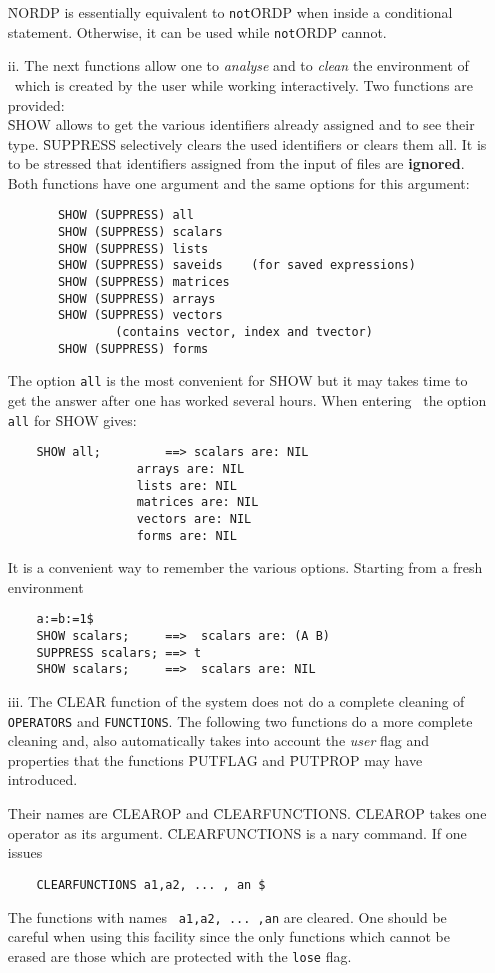 \begin{itemize}
\f{NORDP} is essentially equivalent to \verb+not+\f{ORDP}
when inside a conditional statement. Otherwise, it can be used
while \verb+not+\f{ORDP} cannot.
\item[ii.]
The next functions allow one to {\em analyse} and to {\em clean} the
environment of \REDUCE\  which is created by the user while
working interactively.  Two functions are provided:\\
\f{SHOW} allows to get the various identifiers already
assigned and to see their type.  \f{SUPPRESS}
selectively clears the used identifiers or clears them all.  It is to
be stressed that identifiers assigned from the input of files are {\bf
ignored}.  Both functions have one argument and the same options for
this argument:
\begin{verbatim}
       SHOW (SUPPRESS) all
       SHOW (SUPPRESS) scalars
       SHOW (SUPPRESS) lists
       SHOW (SUPPRESS) saveids    (for saved expressions)
       SHOW (SUPPRESS) matrices
       SHOW (SUPPRESS) arrays
       SHOW (SUPPRESS) vectors
		       (contains vector, index and tvector)
       SHOW (SUPPRESS) forms
\end{verbatim}
The option \verb+all+ is the most convenient for \f{SHOW} but it may
takes time to get the answer after one has worked several hours.
When entering \REDUCE\ the option \verb+all+ for \f{SHOW} gives:
\begin{verbatim}
	SHOW all;         ==> scalars are: NIL
			      arrays are: NIL
			      lists are: NIL
			      matrices are: NIL
			      vectors are: NIL
			      forms are: NIL
\end{verbatim}
It is a convenient way to remember the various options.
Starting from a fresh environment
\begin{verbatim}
	a:=b:=1$
	SHOW scalars;     ==>  scalars are: (A B)
	SUPPRESS scalars; ==> t
	SHOW scalars;     ==>  scalars are: NIL
\end{verbatim}
\item[iii.]
The \f{CLEAR} function of the system does not do a
complete cleaning of \verb+OPERATORS+ and \verb+FUNCTIONS+.  The
following two functions do a more complete cleaning and, also
automatically takes into account the {\em user} flag and properties that the
functions \f{PUTFLAG} and \f{PUTPROP} may have introduced.

Their names are \f{CLEAROP} and
\f{CLEARFUNCTIONS}.
\f{CLEAROP} takes one operator as its argument.  \f{CLEARFUNCTIONS} is
a nary command. If one issues
\begin{verbatim}
	CLEARFUNCTIONS a1,a2, ... , an $
\end{verbatim}
The functions with names \verb+ a1,a2, ... ,an+  are cleared.
One should be careful when using this facility since the
only functions which cannot be erased are those which are
protected with the \verb+lose+ flag.
\end{itemize}

